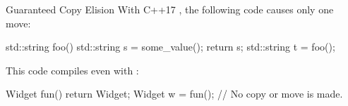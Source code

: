 \begin{frame}[fragile]{Guaranteed Copy Elision}
  With C++17 , the following code causes only one move:
  \begin{cpp}
std::string foo() {
  std::string s = some_value();
  return s;
}
std::string t = foo();
  \end{cpp}
  \pause
  This code compiles even with :
  \begin{cpp}
Widget fun() {
  return Widget{};
}
Widget w = fun(); // No copy or move is made.
  \end{cpp}
\end{frame}